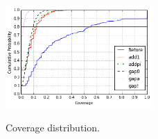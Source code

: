  \begin{figure}[h!]
\centering
  \caption{Coverage distribution.}{}
  \label{f4}
  \centering
    \includegraphics[width=0.5\textwidth]{fig/dist2}
\end{figure}



